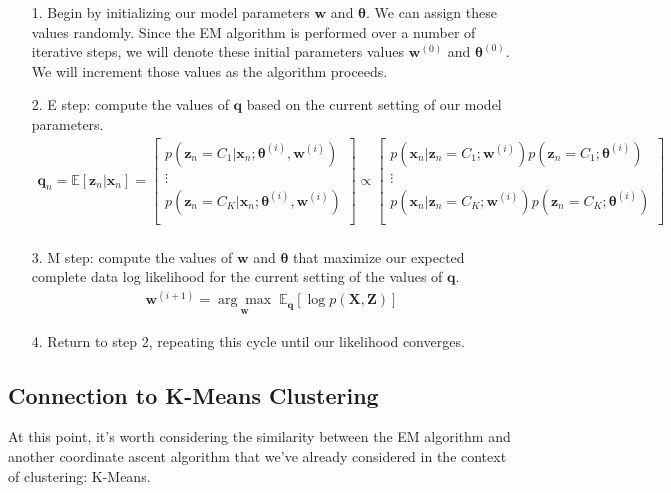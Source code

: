 \begin{itemize}
    \item[1.] Begin by initializing our model parameters $\textbf{w}$ and $\boldsymbol{\theta}$. We can assign these values randomly. Since the EM algorithm is performed over a number of iterative steps, we will denote these initial parameters values $\textbf{w}^{(0)}$ and $\boldsymbol{\theta}^{(0)}$. We will increment those values as the algorithm proceeds.
    \item[2.] E step: compute the values of $\textbf{q}$ based on the current setting of our model parameters.
    \begin{align*}
        \textbf{q}_n = \mathbb{E}[\textbf{z}_n | \textbf{x}_n] = \begin{bmatrix}
                p(\textbf{z}_n = C_1 | \textbf{x}_n; \boldsymbol{\theta}^{(i)}, \textbf{w}^{(i)}) \\
                \vdots \\
                p(\textbf{z}_n = C_K | \textbf{x}_n; \boldsymbol{\theta}^{(i)}, \textbf{w}^{(i)}) \\
            \end{bmatrix} 
            \propto \begin{bmatrix}
            p(\textbf{x}_n | \textbf{z}_n = C_1; \textbf{w}^{(i)})p(\textbf{z}_n = C_1; \boldsymbol{\theta}^{(i)}) \\
            \vdots \\
            p(\textbf{x}_n | \textbf{z}_n = C_K; \textbf{w}^{(i)})p(\textbf{z}_n = C_K; \boldsymbol{\theta}^{(i)}) \\
        \end{bmatrix} \\
    \end{align*}
    \item[3.] M step: compute the values of $\textbf{w}$ and $\boldsymbol{\theta}$ that maximize our expected complete data log likelihood for the current setting of the values of $\textbf{q}$.
    \begin{align*}
        \textbf{w}^{(i + 1)} = \underset{\textbf{w}}{\arg\max} \; \mathbb{E}_{\textbf{q}}[\log p(\textbf{X}, \textbf{Z})]
    \end{align*}
    \item[4.] Return to step 2, repeating this cycle until our likelihood converges.
\end{itemize}

\subsection{Connection to K-Means Clustering}
At this point, it's worth considering the similarity between the EM algorithm and another coordinate ascent algorithm that we've already considered in the context of clustering: K-Means.

